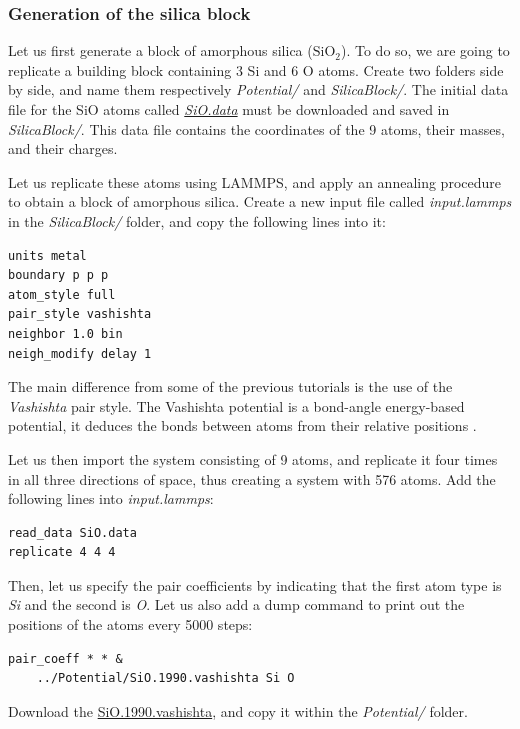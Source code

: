 \documentclass[9pt,tutorial]{livecoms}
\begin{document}
\subsubsection{Generation of the silica block}
\noindent Let us first generate a block of amorphous silica ($\text{SiO}_2$). To do so, we are going to replicate a building block containing 3 Si and 6 O atoms. Create two folders side by side, and name them respectively \textit{Potential/}
and \textit{SilicaBlock/}. The initial data file for the SiO atoms called \href{https://raw.githubusercontent.com/lammpstutorials/lammpstutorials-article/main/files/tutorial6/SiO.data}{\textit{SiO.data}} must be downloaded and saved in \textit{SilicaBlock/}. This data file contains the coordinates of the 9 atoms, their masses, and their charges.

Let us replicate these atoms using LAMMPS, and apply an annealing procedure to obtain a block of amorphous silica. Create a new input file called \textit{input.lammps} in the \textit{SilicaBlock/} folder, and copy
the following lines into it:
{\normalsize \begin{verbatim}
units metal
boundary p p p
atom_style full
pair_style vashishta
neighbor 1.0 bin
neigh_modify delay 1
\end{verbatim}}
The main difference from some of the previous tutorials is the use of the \textit{Vashishta} pair style. The Vashishta potential is a bond-angle energy-based potential, it deduces the bonds between atoms from their relative positions \cite{vashishta1990interaction}. 

Let us then import the system consisting of 9 atoms, and replicate it four times in all three directions of space, thus creating a system with 576 atoms. Add the following lines into \textit{input.lammps}:
{\normalsize \begin{verbatim}
read_data SiO.data
replicate 4 4 4
\end{verbatim}}
Then, let us specify the pair coefficients by indicating that the first atom type is \textit{Si} and the second is \textit{O}. Let us also add a dump command to print out the positions of the atoms every 5000 steps:
{\normalsize \begin{verbatim}
pair_coeff * * &
    ../Potential/SiO.1990.vashishta Si O
\end{verbatim}}
Download the \href{https://raw.githubusercontent.com/lammpstutorials/lammpstutorials-article/main/files/tutorial6/SiO.1990.vashishta}{SiO.1990.vashishta}, and copy it within the \textit{Potential/} folder.
\end{document}
